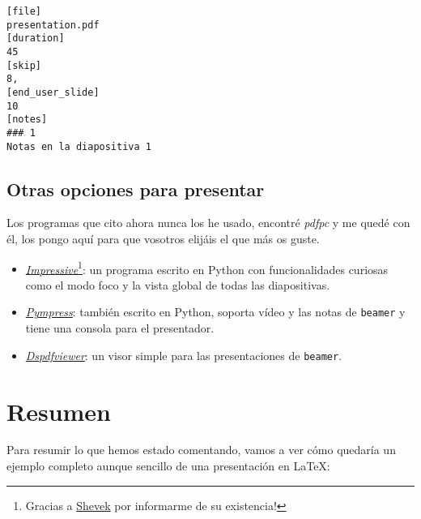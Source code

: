 \begin{lstlisting}
[file]
presentation.pdf
[duration]
45
[skip]
8,
[end_user_slide]
10
[notes]
### 1
Notas en la diapositiva 1
\end{lstlisting}

\subsection{Otras opciones para
presentar}

Los programas que cito ahora nunca los he usado, encontré \emph{pdfpc} y
me quedé con él, los pongo aquí para que vosotros elijáis el que más os
guste.

\begin{itemize}
\item
  \href{http://impressive.sourceforge.net/}{\emph{Impressive}}\footnote{Gracias
    a \href{https://quitter.se/notice/9129937}{Shevek} por informarme de
    su existencia!}: un programa escrito en Python con funcionalidades
  curiosas como el modo foco y la vista global de todas las
  diapositivas.
\item
  \href{https://github.com/Cimbali/pympress}{\emph{Pympress}}: también
  escrito en Python, soporta vídeo y las notas de \lstinline!beamer! y
  tiene una consola para el presentador.
\item
  \href{https://github.com/dannyedel/dspdfviewer}{\emph{Dspdfviewer}}:
  un visor simple para las presentaciones de \lstinline!beamer!.
\end{itemize}

\section{Resumen}

Para resumir lo que hemos estado comentando, vamos a ver cómo quedaría
un ejemplo completo aunque sencillo de una presentación en LaTeX:

